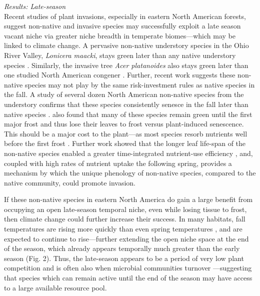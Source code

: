 \documentclass[11pt,a4paper,oneside]{article}
\begin{document}
\noindent \emph{Results: Late-season}\\ %
\noindent Recent studies of plant invasions, especially in eastern North American forests, suggest non-native and invasive species may successfully exploit a late season vacant niche via greater niche breadth in temperate biomes---which may be linked to climate change. A pervasive non-native understory species in the Ohio River Valley, \emph{Lonicera maacki}, stays green later than any native understory species \citep{becker2013}. Similarly, the invasive tree \emph{Acer platanoides} also stays green later than one studied North American congener \citep{paquette2012}. Further, recent work suggests these non-native species may not play by the same risk-investment rules as native species in the fall. A study of several dozen North American non-native species from the understory confirms that these species consistently senesce in the fall later than native species \citep{Fridley:2012fj}. \citet{Fridley:2012fj} also found that many of these species remain green until the first major frost and thus lose their leaves to frost versus plant-induced senescence. This should be a major cost to the plant---as most species resorb nutrients well before the first frost \citep{Lambers:2008jb}. Further work showed that the longer leaf life-span of the non-native species enabled a greater time-integrated nutrient-use efficiency \citep{Heberling2013}, and, coupled with high rates of nutrient uptake the following spring, provides a mechanism by which the unique phenology of non-native species, compared to the native community, could promote invasion.

If these non-native species in eastern North America do gain a large benefit from occupying an open late-season temporal niche, even while losing tissue to frost, then climate change could further increase their success. In many habitats, fall temperatures are rising more quickly than even spring temperatures \citep{cohen2012}, and are expected to continue to rise---further extending the open niche space at the end of the season, which already appears temporally much greater than the early season (Fig. 2). Thus, the late-season appears to be a period of very low plant competition and is often also when microbial communities turnover \citep{Bardgett:2005ls}---suggesting that species which can remain active until the end of the season may have access to a large available resource pool. 
\end{document}
